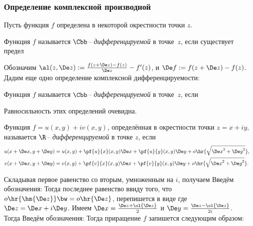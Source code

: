 \documentclass[a4paper]{article}
\begin{document}
\subsubsection{Определение комплексной производной}

Пусть функция $f$ определена в некоторой окрестности точки $z$.

\begin{df}
Функция $f$ называется \emph{$\Cbb$-- дифференцируемой} в точке~$z$, если существует предел
\end{df}

Обозначим $\al(z, \De z) := \frac{f(z + \De z) - f(z)}{\De z} - f'(z)$, и $\De f := f(z+\De z)-f(z)$.
Дадим еще одно определение комплексной дифференцируемости:

\begin{df}
Функция $f$ называется \emph{$\Cbb$-- дифференцируемой} в точке~$z$, если
\end{df}

Равносильность этих определений очевидна.

\begin{df}
Функция $f=u(x,y)+iv(x,y)$, определённая в окрестности точки $z=x+iy$,
называется \emph{$\R$-- дифференцируемой} в точке $z$, если
\begin{align*}
u(x+\De x, y+\De y)&=u(x,y)+\pf{u}{x}(x,y)\De x + \pf{u}{y}(x,y)\De y + o\hr{\sqrt{{\De x}^{2} + {\De y}^2}}, \\
v(x+\De x, y+\De y)&=v(x,y)+\pf{v}{x}(x,y)\De x + \pf{v}{y}(x,y)\De y + o\hr{\sqrt{{\De x}^{2} + {\De y}^2}}.
\end{align*}
\end{df}

Складывая первое равенство со вторым, умноженным на $i$, получаем
Введём обозначения:
Тогда последнее равенство ввиду того, что $o\hr{\hm{\De z}} \bw= o\hr{\De z}$, перепишется в виде
 где $\De z = \De x + i \De y$. Имеем
$\De x = \frac{\De z + \ol{\De z}}{2}$ и $\De y = \frac{\De z - \ol{\De z}}{2i}$. Тогда
Введём обозначения:
Тогда приращение $f$ запишется следующим образом:
\end{document}
